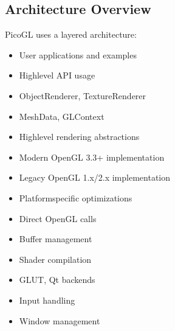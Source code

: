\documentclass[a4paper,10pt,english,openany,oneside]{sphinxmanual}
\begin{document}
\subsection{Architecture Overview}
\label{\detokenize{development:architecture-overview}}
\sphinxAtStartPar
PicoGL uses a layered architecture:
\begin{description}
\begin{itemize}
\item {} 
\sphinxAtStartPar
User applications and examples

\item {} 
\sphinxAtStartPar
High\sphinxhyphen{}level API usage

\end{itemize}

\begin{itemize}
\item {} 
\sphinxAtStartPar
ObjectRenderer, TextureRenderer

\item {} 
\sphinxAtStartPar
MeshData, GLContext

\item {} 
\sphinxAtStartPar
High\sphinxhyphen{}level rendering abstractions

\end{itemize}

\begin{itemize}
\item {} 
\sphinxAtStartPar
Modern OpenGL 3.3+ implementation

\item {} 
\sphinxAtStartPar
Legacy OpenGL 1.x/2.x implementation

\item {} 
\sphinxAtStartPar
Platform\sphinxhyphen{}specific optimizations

\end{itemize}

\begin{itemize}
\item {} 
\sphinxAtStartPar
Direct OpenGL calls

\item {} 
\sphinxAtStartPar
Buffer management

\item {} 
\sphinxAtStartPar
Shader compilation

\end{itemize}

\begin{itemize}
\item {} 
\sphinxAtStartPar
GLUT, Qt backends

\item {} 
\sphinxAtStartPar
Input handling

\item {} 
\sphinxAtStartPar
Window management

\end{itemize}

\end{description}
\end{document}
